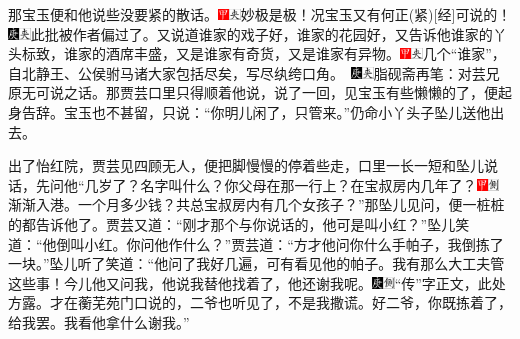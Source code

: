那宝玉便和他说些没要紧的散话。{{\includegraphics[width=3mm]{../Images/00002}\includegraphics[width=3mm]{../Images/00012}\footnotesize \kaishu 妙极是极！况宝玉又有何正{(紧)}{[}经{]}可说的！　\includegraphics[width=3mm]{../Images/00004}\includegraphics[width=3mm]{../Images/00012}\footnotesize \kaishu 此批被作者偏过了。}}又说道谁家的戏子好，谁家的花园好，又告诉他谁家的丫头标致，谁家的酒席丰盛，又是谁家有奇货，又是谁家有异物。{{\includegraphics[width=3mm]{../Images/00002}\includegraphics[width=3mm]{../Images/00012}\footnotesize \kaishu 几个“谁家”，自北静王、公侯驸马诸大家包括尽矣，写尽纨绔口角。　}\includegraphics[width=3mm]{../Images/00004}\includegraphics[width=3mm]{../Images/00012}\footnotesize \kaishu 脂砚斋再笔：对芸兄原无可说之话。}那贾芸口里只得顺着他说，说了一回，见宝玉有些懒懒的了，便起身告辞。宝玉也不甚留，只说：“你明儿闲了，只管来。”仍命小丫头子坠儿送他出去。

出了怡红院，贾芸见四顾无人，便把脚慢慢的停着些走，口里一长一短和坠儿说话，先问他“几岁了？名字叫什么？你父母在那一行上？在宝叔房内几年了？{\includegraphics[width=3mm]{../Images/00002}\includegraphics[width=3mm]{../Images/00011}\footnotesize \kaishu 渐渐入港。}一个月多少钱？共总宝叔房内有几个女孩子？”那坠儿见问，便一桩桩的都告诉他了。贾芸又道：“刚才那个与你说话的，他可是叫小红？”坠儿笑道：“他倒叫小红。你问他作什么？”贾芸道：“方才他问你什么手帕子，我倒拣了一块。”坠儿听了笑道：“他问了我好几遍，可有看见他的帕子。我有那么大工夫管这些事！今儿他又问我，他说我替他找着了，他还谢我呢。{\includegraphics[width=3mm]{../Images/00004}\includegraphics[width=3mm]{../Images/00011}\footnotesize \kaishu “传”字正文，此处方露。}才在蘅芜苑门口说的，二爷也听见了，不是我撒谎。好二爷，你既拣着了，给我罢。我看他拿什么谢我。”

